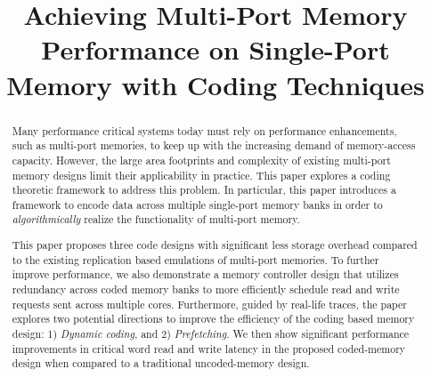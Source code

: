 \documentclass{sig-alternate}
\title{Achieving Multi-Port Memory Performance on Single-Port Memory with Coding Techniques}
\newcommand*\Ethan[1]{{\color{red}{\textbf{[Ethan:~#1]}}}}
\begin{document}
\maketitle
\thispagestyle{firstpage}
\pagestyle{plain}


\begin{abstract}
Many performance critical systems today must rely on performance enhancements, such as multi-port memories, to keep up with the increasing demand of memory-access capacity. However, the large area footprints and complexity of existing multi-port memory designs limit their applicability in practice. This paper explores a coding theoretic framework to address this problem. In particular, this paper introduces a framework to encode data across multiple single-port memory banks in order to {\em algorithmically} realize the functionality of multi-port memory.

This paper proposes three code designs with significant less storage overhead compared to the existing replication based emulations of multi-port memories. To further improve performance, we also demonstrate a memory controller design that utilizes redundancy across coded memory banks to more efficiently schedule read and write requests sent across multiple cores. Furthermore, guided by real-life traces, the paper explores two potential directions to improve the efficiency of the coding based memory design: 1) {\em Dynamic coding}, and 2) {\em Prefetching}. We then show significant performance improvements in critical word read and write latency in the proposed coded-memory design when compared to a traditional uncoded-memory design. \Ethan{real-life, PARSEC, or both?}

\end{abstract}
\end{document}
